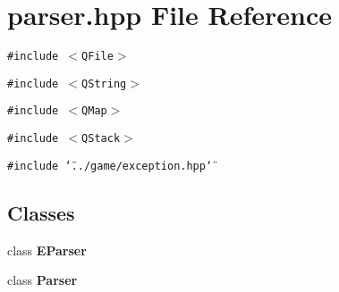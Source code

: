 \section{parser.hpp File Reference}
\label{parser_8hpp}
{\tt \#include $<$QFile$>$}\par
{\tt \#include $<$QString$>$}\par
{\tt \#include $<$QMap$>$}\par
{\tt \#include $<$QStack$>$}\par
{\tt \#include \char`\"{}../game/exception.hpp\char`\"{}}\par
\subsection*{Classes}
\begin{CompactItemize}
\item 
class {\bf EParser}
\item 
class {\bf Parser}
\end{CompactItemize}
